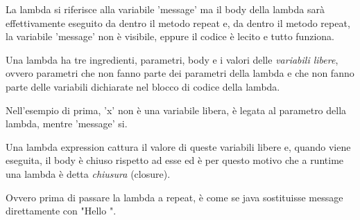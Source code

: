 La lambda si riferisce alla variabile 'message' ma il body della lambda sarà effettivamente eseguito da dentro il metodo repeat e, da dentro il metodo repeat, la 
variabile 'message' non è visibile, eppure il codice è lecito e tutto funziona.

Una lambda ha tre ingredienti, parametri, body e i valori delle \textit{variabili libere}, ovvero parametri che non fanno parte dei parametri della lambda e che non fanno parte
delle variabili dichiarate nel blocco di codice della lambda.

Nell'esempio di prima, 'x' non è una variabile libera, è legata al parametro della lambda, mentre 'message' si.

Una lambda expression cattura il valore di queste variabili libere e, quando viene eseguita, il body è chiuso rispetto ad esse ed è per questo motivo che a runtime una
lambda è detta \textit{chiusura} (closure).

Ovvero prima di passare la lambda a repeat, è come se java sostituisse message direttamente con "Hello ".









